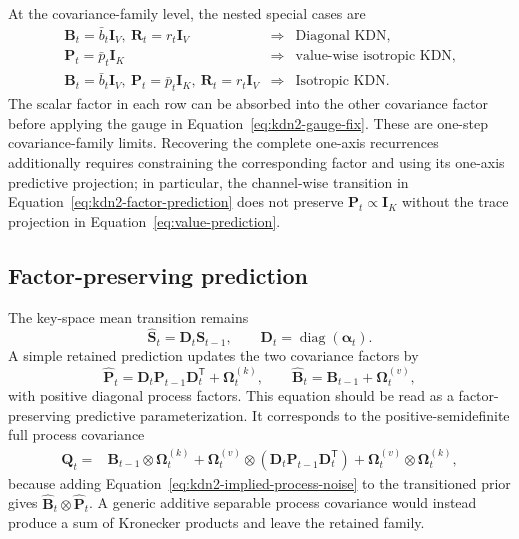 \documentclass[11pt]{article}
\newcommand{\ve}[1]{\boldsymbol{#1}}
\newcommand{\tr}{\mathsf{T}}
\newcommand{\diag}{\operatorname{diag}}
\begin{document}
At the covariance-family level, the nested special cases are
\begin{equation}
\begin{array}{ccl}
  \ve{B}_t=\bar b_t\ve{I}_V,\ \ve{R}_t=r_t\ve{I}_V
  &\Longrightarrow& \text{Diagonal KDN},\\
  \ve{P}_t=\bar p_t\ve{I}_K
  &\Longrightarrow& \text{value-wise isotropic KDN},\\
  \ve{B}_t=\bar b_t\ve{I}_V,\ \ve{P}_t=\bar p_t\ve{I}_K,\ \ve{R}_t=r_t\ve{I}_V
  &\Longrightarrow& \text{Isotropic KDN}.
\end{array}
  \label{eq:kdn2-special-cases}
\end{equation}
The scalar factor in each row can be absorbed into the other covariance factor before applying
the gauge in Equation~\eqref{eq:kdn2-gauge-fix}.  These are one-step covariance-family limits.
Recovering the complete one-axis recurrences additionally requires constraining the corresponding
factor and using its one-axis predictive projection; in particular, the channel-wise transition
in Equation~\eqref{eq:kdn2-factor-prediction} does not preserve
$\ve{P}_t\propto\ve{I}_K$ without the trace projection in
Equation~\eqref{eq:value-prediction}.

\subsection{Factor-preserving prediction}

The key-space mean transition remains
\begin{equation}
  \widehat{\ve{S}}_t=\ve{D}_t\ve{S}_{t-1},
  \qquad
  \ve{D}_t=\diag(\ve{\alpha}_t).
  \label{eq:kdn2-mean-prediction}
\end{equation}
A simple retained prediction updates the two covariance factors by
\begin{equation}
  \widehat{\ve{P}}_t
  =\ve{D}_t\ve{P}_{t-1}\ve{D}_t^{\tr}+\ve{\Omega}^{(k)}_t,
  \qquad
  \widehat{\ve{B}}_t
  =\ve{B}_{t-1}+\ve{\Omega}^{(v)}_t,
  \label{eq:kdn2-factor-prediction}
\end{equation}
with positive diagonal process factors.  This equation should be read as a factor-preserving
predictive parameterization.  It corresponds to the positive-semidefinite full process
covariance
\begin{equation}
\begin{aligned}
  \ve{Q}_t
  ={}&\ve{B}_{t-1}\otimes\ve{\Omega}^{(k)}_t
  +\ve{\Omega}^{(v)}_t\otimes
    (\ve{D}_t\ve{P}_{t-1}\ve{D}_t^{\tr})
  +\ve{\Omega}^{(v)}_t\otimes\ve{\Omega}^{(k)}_t,
\end{aligned}
  \label{eq:kdn2-implied-process-noise}
\end{equation}
because adding Equation~\eqref{eq:kdn2-implied-process-noise} to the transitioned prior gives
$\widehat{\ve{B}}_t\otimes\widehat{\ve{P}}_t$.  A generic additive separable process covariance
would instead produce a sum of Kronecker products and leave the retained family.
\end{document}
